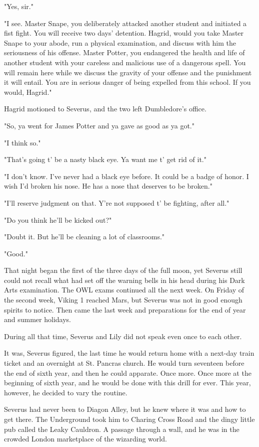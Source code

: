 \documentclass[a4paper,11pt]{article}
\begin{document}
"Yes, sir."

"I see. Master Snape, you deliberately attacked another student and initiated a fist fight. You will receive two days' detention. Hagrid, would you take Master Snape to your abode, run a physical examination, and discuss with him the seriousness of his offense. Master Potter, you endangered the health and life of another student with your careless and malicious use of a dangerous spell. You will remain here while we discuss the gravity of your offense and the punishment it will entail. You are in serious danger of being expelled from this school. If you would, Hagrid."

Hagrid motioned to Severus, and the two left Dumbledore's office.

"So, ya went for James Potter and ya gave as good as ya got."

"I think so."

"That's going t' be a nasty black eye. Ya want me t' get rid of it."

"I don't know. I've never had a black eye before. It could be a badge of honor. I wish I'd broken his nose. He has a nose that deserves to be broken."

"I'll reserve judgment on that. Y're not supposed t' be fighting, after all."

"Do you think he'll be kicked out?"

"Doubt it. But he'll be cleaning a lot of classrooms."

"Good."

That night began the first of the three days of the full moon, yet Severus still could not recall what had set off the warning bells in his head during his Dark Arts examination. The OWL exams continued all the next week. On Friday of the second week, Viking 1 reached Mars, but Severus was not in good enough spirits to notice. Then came the last week and preparations for the end of year and summer holidays.

During all that time, Severus and Lily did not speak even once to each other.

It was, Severus figured, the last time he would return home with a next-day train ticket and an overnight at St. Pancras church. He would turn seventeen before the end of sixth year, and then he could apparate. Once more. Once more at the beginning of sixth year, and he would be done with this drill for ever. This year, however, he decided to vary the routine.

Severus had never been to Diagon Alley, but he knew where it was and how to get there. The Underground took him to Charing Cross Road and the dingy little pub called the Leaky Cauldron. A passage through a wall, and he was in the crowded London marketplace of the wizarding world.
\end{document}
